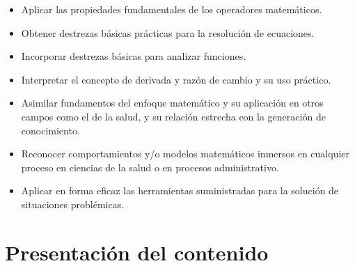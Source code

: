 \documentclass[
]{book}
\begin{document}
\begin{itemize}
\item
  Aplicar las propiedades fundamentales de los operadores matemáticos.
\item
  Obtener destrezas básicas prácticas para la resolución de ecuaciones.
\item
  Incorporar destrezas básicas para analizar funciones.
\item
  Interpretar el concepto de derivada y razón de cambio y su uso práctico.
\item
  Asimilar fundamentos del enfoque matemático y su aplicación en otros campos como el de la salud, y su relación estrecha con la generación de conocimiento.
\item
  Reconocer comportamientos y/o modelos matemáticos inmersos en cualquier proceso en ciencias de la salud o en procesos administrativo.
\item
  Aplicar en forma eficaz las herramientas suministradas para la solución de situaciones problémicas.
\end{itemize}

\hypertarget{presentaciuxf3n-del-contenido}{%
\section{Presentación del contenido}\label{presentaciuxf3n-del-contenido}}
\end{document}
